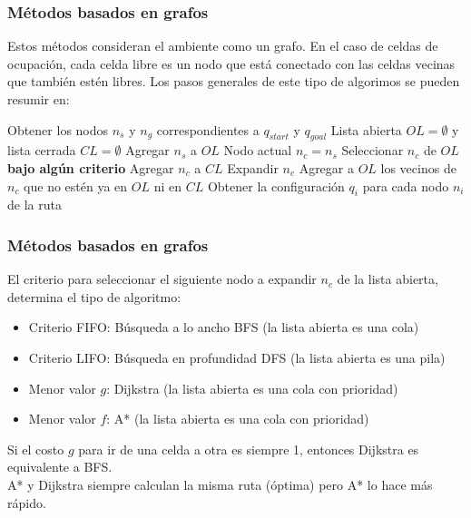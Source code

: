 \begin{frame}\frametitle{Métodos basados en grafos}
  Estos métodos consideran el ambiente como un grafo. En el caso de celdas de ocupación, cada celda libre es un nodo que está conectado con las celdas vecinas que también estén libres. Los pasos generales de este tipo de algorimos se pueden resumir en:
  \[\]
  \begin{algorithm}[H]
    \footnotesize
    \DontPrintSemicolon
    Obtener los nodos $n_s$ y $n_g$ correspondientes a $q_{start}$ y $q_{goal}$\;
    Lista abierta $OL = \emptyset$ y lista cerrada $CL = \emptyset$\;
    Agregar $n_s$ a $OL$\;
    Nodo actual $n_c = n_s$\;
    {
      Seleccionar $n_c$ de $OL$ \textbf{bajo algún criterio}\;
      Agregar $n_c$ a $CL$\;
      Expandir $n_c$\;
      Agregar a $OL$ los vecinos de $n_c$ que no estén ya en $OL$ ni en $CL$\;
    }
    Obtener la configuración $q_i$ para cada nodo $n_i$ de la ruta\;
  \end{algorithm}
\end{frame}

\begin{frame}\frametitle{Métodos basados en grafos}
  El criterio para seleccionar el siguiente nodo a expandir $n_c$ de la lista abierta, determina el tipo de algoritmo:
  \begin{itemize}
  \item Criterio FIFO: Búsqueda a lo ancho BFS (la lista abierta es una cola)
  \item Criterio LIFO:  Búsqueda en profundidad DFS (la lista abierta es una pila)
  \item Menor valor $g$: Dijkstra (la lista abierta es una cola con prioridad)
  \item Menor valor $f$: A* (la lista abierta es una cola con prioridad)
  \end{itemize}
  Si el costo $g$ para ir de una celda a otra es siempre 1, entonces Dijkstra es equivalente a BFS. \\
  A* y Dijkstra siempre calculan la misma ruta (óptima) pero A* lo hace más rápido. 
\end{frame}


